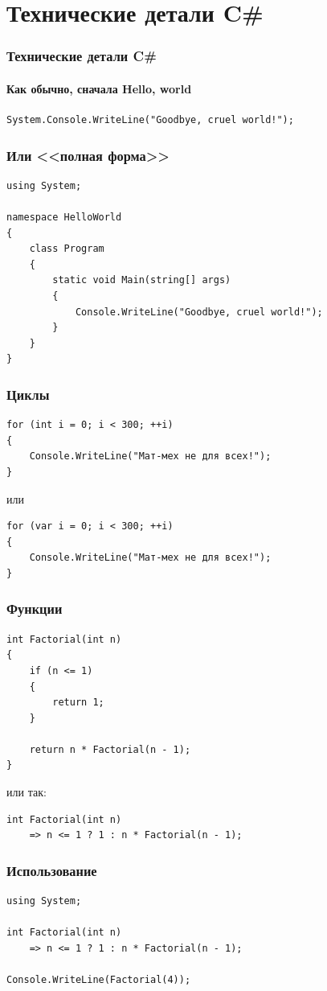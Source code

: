 \documentclass{../../slides-style}
\begin{document}
    \section{Технические детали C\#}

    \begin{frame}[fragile]
        \frametitle{Технические детали C\#}
        \framesubtitle{Как обычно, сначала Hello, world}
        \begin{verbatim}
System.Console.WriteLine("Goodbye, cruel world!");
        \end{verbatim}
    \end{frame}

    \begin{frame}[fragile]
        \frametitle{Или <<полная форма>>}
        \begin{verbatim}
using System;

namespace HelloWorld
{
    class Program
    {
        static void Main(string[] args)
        {
            Console.WriteLine("Goodbye, cruel world!");
        }
    }
}
        \end{verbatim}
    \end{frame}

    \begin{frame}[fragile]
        \frametitle{Циклы}
        \begin{verbatim}
for (int i = 0; i < 300; ++i)
{
    Console.WriteLine("Мат-мех не для всех!");
}
        \end{verbatim}
        или
        \begin{verbatim}
for (var i = 0; i < 300; ++i)
{
    Console.WriteLine("Мат-мех не для всех!");
}
        \end{verbatim}
    \end{frame}

    \begin{frame}[fragile]
        \frametitle{Функции}
        \begin{verbatim}
int Factorial(int n)
{
    if (n <= 1)
    {
        return 1;
    }

    return n * Factorial(n - 1);
}
        \end{verbatim}
        или так:
        \begin{verbatim}
int Factorial(int n) 
    => n <= 1 ? 1 : n * Factorial(n - 1);
        \end{verbatim}
    \end{frame}

    \begin{frame}[fragile]
        \frametitle{Использование}
        \begin{verbatim}
using System;

int Factorial(int n) 
    => n <= 1 ? 1 : n * Factorial(n - 1);

Console.WriteLine(Factorial(4));

        \end{verbatim}
    \end{frame}
\end{document}
